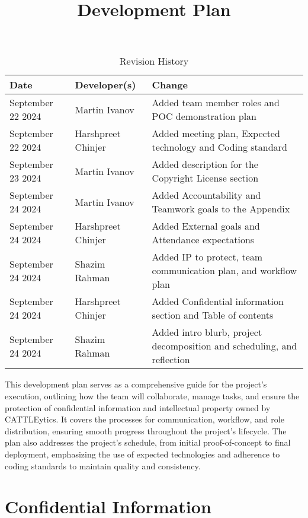 \documentclass{article}
\title{Development Plan\\\progname}
\author{\authname}
\date{}
\begin{document}
\maketitle

\begin{table}[hp]
\caption{Revision History} \label{TblRevisionHistory}
\begin{tabularx}{\textwidth}{llX}
\toprule
\textbf{Date} & \textbf{Developer(s)} & \textbf{Change}\\
\midrule
September 22 2024 & Martin Ivanov & Added team member roles and POC demonstration plan\\
September 22 2024 & Harshpreet Chinjer & Added meeting plan, Expected technology and Coding standard\\
September 23 2024 & Martin Ivanov & Added description for the Copyright License section\\
September 24 2024 & Martin Ivanov & Added Accountability and Teamwork goals to the Appendix\\
September 24 2024 & Harshpreet Chinjer & Added External goals and Attendance expectations\\
September 24 2024 & Shazim Rahman & Added IP to protect, team communication plan, and workflow plan\\
September 24 2024 & Harshpreet Chinjer & Added Confidential information section and Table of contents\\
September 24 2024 & Shazim Rahman & Added intro blurb, project decomposition and scheduling, and reflection\\
\bottomrule
\end{tabularx}
\end{table}

\newpage{}

\tableofcontents

\newpage{}
This development plan serves as a comprehensive guide for the project's execution, outlining how the team will collaborate, manage tasks, and ensure the protection of confidential information and intellectual property owned by CATTLEytics. It covers the processes for communication, workflow, and role distribution, ensuring smooth progress throughout the project's lifecycle. The plan also addresses the project's schedule, from initial proof-of-concept to final deployment, emphasizing the use of expected technologies and adherence to coding standards to maintain quality and consistency.

\section{Confidential Information}
\end{document}
